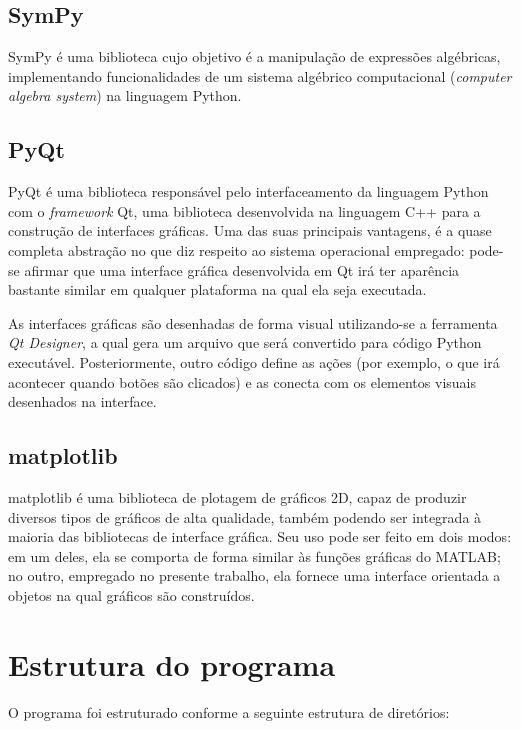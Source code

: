 \subsection{SymPy}
SymPy \cite{sympydoc} é uma biblioteca cujo objetivo é a manipulação de expressões algébricas, implementando funcionalidades de um sistema algébrico computacional (\textit{computer algebra system}) na linguagem Python. 

\subsection{PyQt}
PyQt é uma biblioteca responsável pelo interfaceamento da linguagem Python com o \textit{framework} Qt, uma biblioteca desenvolvida na linguagem C++ para a construção de interfaces gráficas. Uma das suas principais vantagens, é a quase completa abstração no que diz respeito ao sistema operacional empregado: pode-se afirmar que uma interface gráfica desenvolvida em Qt irá ter aparência bastante similar em qualquer plataforma na qual ela seja executada.

As interfaces gráficas são desenhadas de forma visual utilizando-se a ferramenta \textit{Qt Designer}, a qual gera um arquivo que será convertido para código Python executável. Posteriormente, outro código define as ações (por exemplo, o que irá acontecer quando botões são clicados) e as conecta com os elementos visuais desenhados na interface.

\subsection{matplotlib}
matplotlib é uma biblioteca de plotagem de gráficos 2D, capaz de produzir diversos tipos de gráficos de alta qualidade, também podendo ser integrada à maioria das bibliotecas de interface gráfica. Seu uso pode ser feito em dois modos: em um deles, ela se comporta de forma similar às funções gráficas do MATLAB; no outro, empregado no presente trabalho, ela fornece uma interface orientada a objetos na qual gráficos são construídos.


\section{Estrutura do programa}

O programa foi estruturado conforme a seguinte estrutura de diretórios:


